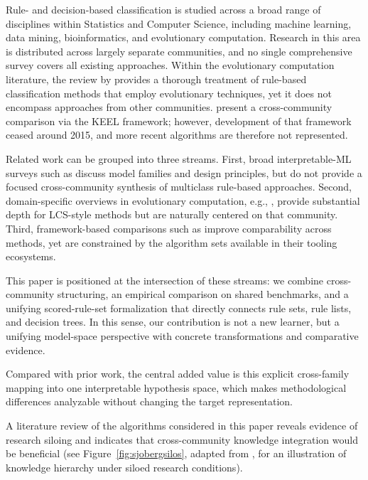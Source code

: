 \documentclass[a4paper,twoside]{article}
\begin{document}
Rule- and decision-based classification is studied across a broad range of disciplines within Statistics and Computer Science, including machine learning, data mining, bioinformatics, and evolutionary computation. Research in this area is distributed across largely separate communities, and no single comprehensive survey covers all existing approaches. Within the evolutionary computation literature, the review by \citet{urbanowicz_moore_2009} provides a thorough treatment of rule-based classification methods that employ evolutionary techniques, yet it does not encompass approaches from other communities. \citet{alcala-fdez_keel_2009} present a cross-community comparison via the KEEL framework; however, development of that framework ceased around 2015, and more recent algorithms are therefore not represented.


Related work can be grouped into three streams. First, broad interpretable-ML surveys such as \citet{RudinEtAlSurvey2022} discuss model families and design principles, but do not provide a focused cross-community synthesis of multiclass rule-based approaches. Second, domain-specific overviews in evolutionary computation, e.g., \citet{urbanowicz_moore_2009}, provide substantial depth for LCS-style methods but are naturally centered on that community. Third, framework-based comparisons such as \citet{alcala-fdez_keel_2009} improve comparability across methods, yet are constrained by the algorithm sets available in their tooling ecosystems.

This paper is positioned at the intersection of these streams: we combine cross-community structuring, an empirical comparison on shared benchmarks, and a unifying scored-rule-set formalization that directly connects rule sets, rule lists, and decision trees. In this sense, our contribution is not a new learner, but a unifying model-space perspective with concrete transformations and comparative evidence.

Compared with prior work, the central added value is this explicit cross-family mapping into one interpretable hypothesis space, which makes methodological differences analyzable without changing the target representation.

A literature review of the algorithms considered in this paper reveals evidence of research siloing and indicates that cross-community knowledge integration would be beneficial (see Figure~\ref{fig:sjobergsilos}, adapted from \cite{10.1007/978-3-319-49094-6_1,software5010012}, for an illustration of knowledge hierarchy under siloed research conditions).
\end{document}
